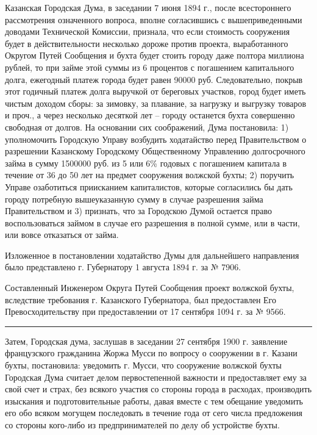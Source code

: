 \documentclass[oneside,final,14pt]{extreport}
\begin{document}
	Казанская Городская Дума, в заседании 7 июня 1894 г., после всестороннего рассмотрения означенного вопроса, вполне согласившись с вышеприведенными доводами Технической Комиссии, признала, что если стоимость сооружения будет в действительности несколько дороже против проекта, выработанного Округом Путей Сообщения и бухта будет стоить городу даже полтора миллиона рублей, то при займе этой суммы из 6 процентов с погашением капитального долга, ежегодный платеж города будет равен 90000 руб. Следовательно, покрыв этот годичный платеж долга выручкой от береговых участков, город будет иметь чистым доходом сборы: за зимовку, за плавание, за нагрузку и выгрузку товаров и проч., а через несколько десяткой лет -- городу останется бухта совершенно свободная от долгов. На основании сих соображений, Дума постановила: 1) уполномочить Городскую Управу возбудить ходатайство перед Правительством о разрешении Казанскому Городскому Общественному Управлению долгосрочного займа в сумму 1500000 руб. из 5 или 6\% годовых с погашением капитала в течение от 36 до 50 лет на предмет сооружения волжской бухты; 2) поручить Управе озаботиться приисканием капиталистов, которые согласились бы дать городу потребную вышеуказанную сумму в случае разрешения займа Правительством и 3) признать, что за Городскою Думой остается право воспользоваться займом в случае его разрешения в полной сумме, или в части, или вовсе отказаться от займа.
	
	Изложенное в постановлении ходатайство Думы для дальнейшего направления было представлено г. Губернатору 1 августа 1894 г. за № 7906.
	
	Составленный Инженером Округа Путей Сообщения проект волжской бухты, вследствие требования г. Казанского Губернатора, был предоставлен Его Превосходительству при предоставлении от 17 сентября 1094 г. за № 9566.
	\begin{center}
		\noindent\rule{4cm}{0.4pt}
	\end{center}
	
	Затем, Городская дума, заслушав в заседании 27 сентября 1900 г. заявление французского гражданина Жоржа Мусси по вопросу о сооружении в г. Казани бухты, постановила: уведомить г. Мусси, что сооружение волжской бухты Городская Дума считает делом первостепенной важности и предоставляет ему за свой счет и страх, без всякого участия со стороны города в расходах, производить изыскания и подготовительные работы, давая вместе с тем обещание уведомить его обо всяком могущем последовать в течение года от сего числа предложения со стороны кого-либо из предпринимателей по делу об устройстве бухты.
	
\end{document}
